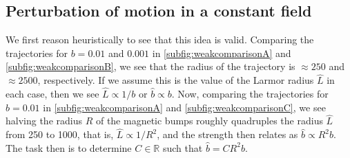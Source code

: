 \subsection{Perturbation of motion in a constant field}

We first reason heuristically to see that this idea is valid. Comparing the trajectories for $b=0.01$ and $ 0.001$ in \cref{subfig:weakcomparisonA} and \ref{subfig:weakcomparisonB}, we see that the radius of the trajectory is $\approx250$ and $\approx2500$, respectively. If we assume this is the value of the Larmor radius $\hat L$ in each case, then we see $\hat L\varpropto 1/b$ or $\hat b\varpropto b$. Now, comparing the trajectories for $b=0.01$ in \cref{subfig:weakcomparisonA} and \ref{subfig:weakcomparisonC}, we see halving the radius $R$ of the magnetic bumps roughly quadruples the radius $\hat L$ from 250 to 1000, that is, $\hat L\varpropto 1/R^2$, and the strength then relates as $\hat b \varpropto R^2b$. The task then is to determine $C\in\mathbb R$ such that $\hat b = CR^2b$.

